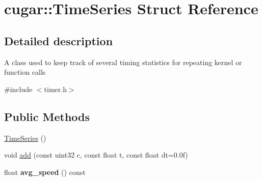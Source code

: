 \hypertarget{structcugar_1_1_time_series}{}\section{cugar\+:\+:Time\+Series Struct Reference}
\label{structcugar_1_1_time_series}


\subsection{Detailed description}
A class used to keep track of several timing statistics for repeating kernel or function calls 

{\ttfamily \#include $<$timer.\+h$>$}

\subsection*{Public Methods}
\begin{DoxyCompactItemize}
\item 
\hyperlink{structcugar_1_1_time_series_aaf2e2067f2e771cb6d4540b4554fb86a}{Time\+Series} ()
\item 
void \hyperlink{structcugar_1_1_time_series_aed1636551337b044109839b64aef31ad}{add} (const uint32 c, const float t, const float dt=0.\+0f)
\item 
\mbox{\label{structcugar_1_1_time_series_a08aa28ed19bceb199cd873755efb4dfd}} 
float {\bfseries avg\+\_\+speed} () const
\end{DoxyCompactItemize}
